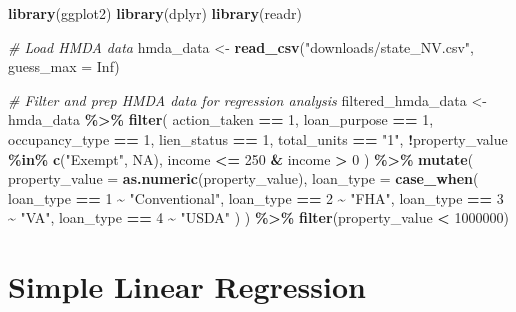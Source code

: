 \documentclass[
]{book}
\newenvironment{Shaded}{\begin{snugshade}}{\end{snugshade}}
\newcommand{\AttributeTok}[1]{\textcolor[rgb]{0.13,0.29,0.53}{#1}}
\newcommand{\CommentTok}[1]{\textcolor[rgb]{0.56,0.35,0.01}{\textit{#1}}}
\newcommand{\ConstantTok}[1]{\textcolor[rgb]{0.56,0.35,0.01}{#1}}
\newcommand{\DecValTok}[1]{\textcolor[rgb]{0.00,0.00,0.81}{#1}}
\newcommand{\FunctionTok}[1]{\textcolor[rgb]{0.13,0.29,0.53}{\textbf{#1}}}
\newcommand{\NormalTok}[1]{#1}
\newcommand{\OtherTok}[1]{\textcolor[rgb]{0.56,0.35,0.01}{#1}}
\newcommand{\SpecialCharTok}[1]{\textcolor[rgb]{0.81,0.36,0.00}{\textbf{#1}}}
\newcommand{\StringTok}[1]{\textcolor[rgb]{0.31,0.60,0.02}{#1}}
\begin{document}
\begin{Shaded}
\begin{Highlighting}[]
\FunctionTok{library}\NormalTok{(ggplot2)}
\FunctionTok{library}\NormalTok{(dplyr)}
\FunctionTok{library}\NormalTok{(readr)}

\CommentTok{\# Load HMDA data}
\NormalTok{hmda\_data }\OtherTok{\textless{}{-}} \FunctionTok{read\_csv}\NormalTok{(}\StringTok{"downloads/state\_NV.csv"}\NormalTok{, }\AttributeTok{guess\_max =} \ConstantTok{Inf}\NormalTok{)}

\CommentTok{\# Filter and prep HMDA data for regression analysis}
\NormalTok{filtered\_hmda\_data }\OtherTok{\textless{}{-}}\NormalTok{ hmda\_data }\SpecialCharTok{\%\textgreater{}\%}
  \FunctionTok{filter}\NormalTok{(}
\NormalTok{    action\_taken }\SpecialCharTok{==} \DecValTok{1}\NormalTok{,}
\NormalTok{    loan\_purpose }\SpecialCharTok{==} \DecValTok{1}\NormalTok{,}
\NormalTok{    occupancy\_type }\SpecialCharTok{==} \DecValTok{1}\NormalTok{,}
\NormalTok{    lien\_status }\SpecialCharTok{==} \DecValTok{1}\NormalTok{,}
\NormalTok{    total\_units }\SpecialCharTok{==} \StringTok{"1"}\NormalTok{,}
    \SpecialCharTok{!}\NormalTok{property\_value }\SpecialCharTok{\%in\%} \FunctionTok{c}\NormalTok{(}\StringTok{"Exempt"}\NormalTok{, }\ConstantTok{NA}\NormalTok{),}
\NormalTok{    income }\SpecialCharTok{\textless{}=} \DecValTok{250} \SpecialCharTok{\&}\NormalTok{ income }\SpecialCharTok{\textgreater{}} \DecValTok{0}
\NormalTok{  ) }\SpecialCharTok{\%\textgreater{}\%}
  \FunctionTok{mutate}\NormalTok{(}
    \AttributeTok{property\_value =} \FunctionTok{as.numeric}\NormalTok{(property\_value),}
    \AttributeTok{loan\_type =} \FunctionTok{case\_when}\NormalTok{(}
\NormalTok{      loan\_type }\SpecialCharTok{==} \DecValTok{1} \SpecialCharTok{\textasciitilde{}} \StringTok{"Conventional"}\NormalTok{,}
\NormalTok{      loan\_type }\SpecialCharTok{==} \DecValTok{2} \SpecialCharTok{\textasciitilde{}} \StringTok{"FHA"}\NormalTok{,}
\NormalTok{      loan\_type }\SpecialCharTok{==} \DecValTok{3} \SpecialCharTok{\textasciitilde{}} \StringTok{"VA"}\NormalTok{,}
\NormalTok{      loan\_type }\SpecialCharTok{==} \DecValTok{4} \SpecialCharTok{\textasciitilde{}} \StringTok{"USDA"}
\NormalTok{    )}
\NormalTok{  ) }\SpecialCharTok{\%\textgreater{}\%}
  \FunctionTok{filter}\NormalTok{(property\_value }\SpecialCharTok{\textless{}} \DecValTok{1000000}\NormalTok{)}
\end{Highlighting}
\end{Shaded}

\hypertarget{simple-linear-regression}{%
\section{Simple Linear Regression}\label{simple-linear-regression}}
\end{document}
